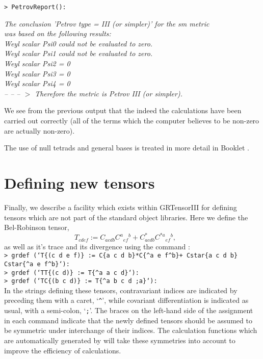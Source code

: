 \documentclass{article}
\begin{document}
{\noindent\texttt{> PetrovReport():}
\begin{center}\textit{
  The conclusion 'Petrov type = III (or simpler)' for the sm metric\\
  was based on the following results:\\
  Weyl scalar Psi0 could not be evaluated to zero.\\
  Weyl scalar Psi1 could not be evaluated to zero.\\
  Weyl scalar Psi2 = 0\\
  Weyl scalar Psi3 = 0\\
  Weyl scalar Psi4 = 0}\\

\textit{-- -- -- $>$ Therefore the metric is Petrov III (or simpler).
}
\end{center}

\noindent We see from the previous output that the indeed the calculations
have been carried out correctly (all of the terms which the computer believes
to be non-zero are actually non-zero).

The use of null tetrads and general bases is treated in more detail in
Booklet \grBasisRef.
%
\section{Defining new tensors}
Finally, we describe a facility which exists within GRTensorIII for defining
tensors which are not part of the standard object libraries. Here we
define the Bel-Robinson tensor, 
\[
  T_{cdef} := C_{acdb}C^a{}_{ef}{}^b+C^*_{acdb}C^{*a}{}_{ef}{}^b,\qquad
\]
as well as it's trace and its divergence using the command :\\

\noindent\texttt{> grdef (`T\{(c d e f)\} := C\{a c d b\}*C\{\^{}a e f\^{}b\}+
  Cstar\{a c d b\}\\
  \indent *Cstar\{\^{}a e f\^{}b\}`):\\
> grdef (`TT\{(c d)\} := T\{\^{}a a c d\}`):\\
> grdef (`TC\{(b c d)\} := T\{\^{}a b c d ;a\}`):}\\

\noindent In the strings defining these tensors, contravariant 
indices are indicated by preceding them with a caret, `\texttt{\^{}}',
while covariant differentiation is indicated as usual, with a
semi-colon, `\texttt{;}'.  The braces on the left-hand side of the
assignment in each command indicate that the newly defined tensors
should be assumed to be symmetric under interchange of their indices.
The calculation functions which are automatically generated by
 will take these symmetries into account to improve the
efficiency of calculations.

}
\end{document}
